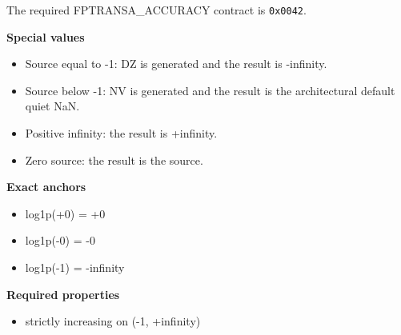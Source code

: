 The required FPTRANSA\_ACCURACY contract is \texttt{0x0042}.

\textbf{Special values}\par
\begin{itemize}
\item Source equal to -1: DZ is generated and the result is -infinity.
\item Source below -1: NV is generated and the result is the architectural default quiet NaN.
\item Positive infinity: the result is +infinity.
\item Zero source: the result is the source.
\end{itemize}

\textbf{Exact anchors}\par
\begin{itemize}
\item log1p(+0) = +0
\item log1p(-0) = -0
\item log1p(-1) = -infinity
\end{itemize}

\textbf{Required properties}\par
\begin{itemize}
\item strictly increasing on (-1, +infinity)
\end{itemize}
